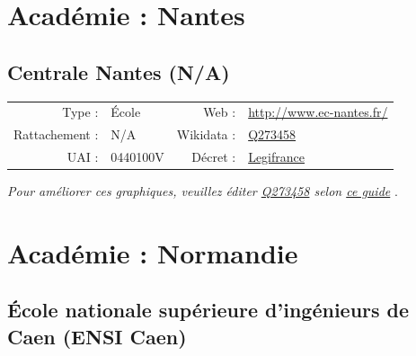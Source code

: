 \documentclass[11pt,french,landscape]{article}
\begin{document}

\newpage

\hypertarget{acaduxe9mie-nantes-1}{%
\section{Académie : Nantes}\label{acaduxe9mie-nantes-1}}

\hypertarget{centrale-nantes-na}{%
\subsection{Centrale Nantes (N/A)}\label{centrale-nantes-na}}

\begin{tabular*}{0.45\textwidth}{rp{2cm}rl}  
\hline  
Type : & École & Web : &\href{http://www.ec-nantes.fr/}{http://www.ec-nantes.fr/} \\  
Rattachement : & N/A & Wikidata : & \href{https://www.wikidata.org/entity/Q273458}{Q273458} \\  
UAI : & 0440100V & Décret : & \href{http://www.legifrance.gouv.fr/affichTexte.do?dateTexte=&categorieLien=id&cidTexte=JORFTEXT000000517472&fastPos=1&fastReqId=701362281&oldAction=rechExpTexteJorf}{Legifrance} \\  
\hline  
\end{tabular*}

\textit{\scriptsize Pour améliorer ces graphiques, veuillez éditer \href{https://www.wikidata.org/entity/Q273458}{Q273458}  selon \href{https://github.com/cpesr/wikidataESR/blob/master/Rmd/wikidataESR.md}{ce guide}}
.


\newpage

\hypertarget{acaduxe9mie-normandie-1}{%
\section{Académie : Normandie}\label{acaduxe9mie-normandie-1}}

\hypertarget{uxe9cole-nationale-supuxe9rieure-dinguxe9nieurs-de-caen-ensi-caen}{%
\subsection{École nationale supérieure d'ingénieurs de Caen (ENSI
Caen)}\label{uxe9cole-nationale-supuxe9rieure-dinguxe9nieurs-de-caen-ensi-caen}}
\end{document}
